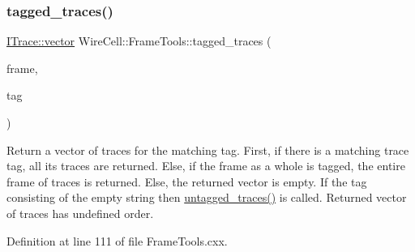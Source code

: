 \subsubsection{\texorpdfstring{tagged\+\_\+traces()}{tagged\_traces()}}
{\footnotesize\ttfamily \hyperlink{class_wire_cell_1_1_i_data_ae1a9f863380499bb43f39fabb6276660}{I\+Trace\+::vector} Wire\+Cell\+::\+Frame\+Tools\+::tagged\+\_\+traces (\begin{DoxyParamCaption}\item[{\hyperlink{class_wire_cell_1_1_i_data_aff870b3ae8333cf9265941eef62498bc}{I\+Frame\+::pointer}}]{frame,  }\item[{\hyperlink{class_wire_cell_1_1_i_frame_ae206ba618e10f398625dfeb675a4215a}{I\+Frame\+::tag\+\_\+t}}]{tag }\end{DoxyParamCaption})}

Return a vector of traces for the matching tag. First, if there is a matching trace tag, all its traces are returned. Else, if the frame as a whole is tagged, the entire frame of traces is returned. Else, the returned vector is empty. If the tag consisting of the empty string then \hyperlink{namespace_wire_cell_1_1_frame_tools_ab39e5b3fae9cf0abda7e6795007ad6df}{untagged\+\_\+traces()} is called. Returned vector of traces has undefined order. 

Definition at line 111 of file Frame\+Tools.\+cxx.

